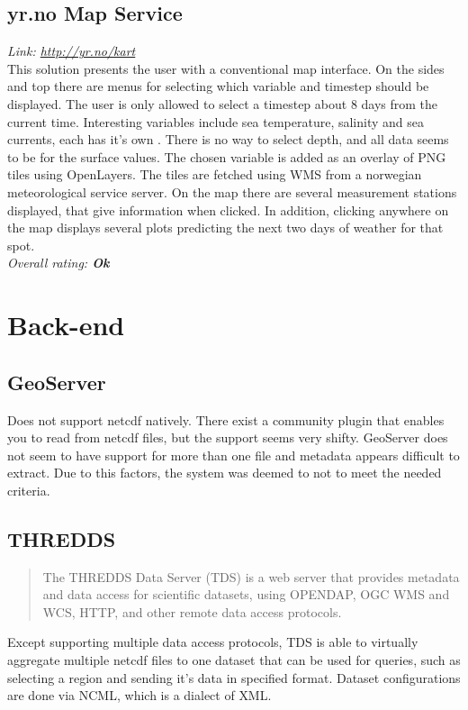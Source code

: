 \documentclass[11pt,a4paper,titlepage,oneside]{report}
\begin{document}
  \subsection{yr.no Map Service}
  \emph{Link: \url{http://yr.no/kart}} \\%
This solution presents the user with a conventional map interface. On the sides and top there are menus for selecting which variable and timestep should be displayed. The user is only allowed to select a timestep about 8 days from the current time. Interesting variables include sea temperature, salinity and sea currents, each has it's own . There is no way to select depth, and all data seems to be for the surface values. The chosen variable is added as an overlay of \gls{PNG} tiles using OpenLayers. The tiles are fetched using \gls{WMS} from a norwegian meteorological service server. On the map there are several measurement stations displayed, that give information when clicked. In addition, clicking anywhere on the map displays several plots predicting the next two days of weather for that spot.
  \\ \emph{Overall rating: \textbf{Ok}}

\section{Back-end}

\subsection{GeoServer}
Does not support \gls{netcdf} natively. There exist a community plugin that enables you to read from \gls{netcdf} files, but the support seems very shifty. GeoServer does not seem to have support for more than one file and metadata appears difficult to extract. Due to this factors, the system was deemed to not to meet the needed criteria.

\subsection{THREDDS}
\begin{quote}
The \gls{THREDDS} Data Server (TDS) is a web server that provides metadata and data access for scientific datasets, using \gls{OPENDAP}, \gls{OGC} \gls{WMS} and \gls{WCS}, \gls{HTTP}, and other remote data access \glspl{protocol}. \cite{TDS:Web}
\end{quote}

  Except supporting multiple data access \glspl{protocol}, \gls{TDS} is able to virtually aggregate multiple \gls{netcdf} files to one dataset that can be used for queries, such as selecting a region and sending it's data in specified format. Dataset configurations are done via \gls{NCML}, which is a dialect of \gls{XML}.
\end{document}
